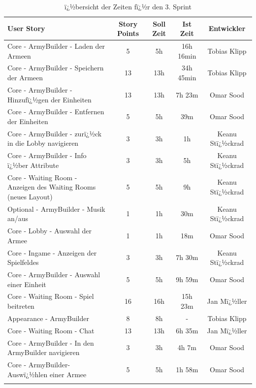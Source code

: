 \documentclass[12pt, titlepage]{scrartcl}
\begin{document}
		\begin{center}
				\begin{longtable}{p{6cm} c c c c }
					
					User Story	& Story Points & Soll Zeit & Ist Zeit & Entwickler\\
					\toprule
					\endhead
					Core - ArmyBuilder - Laden der Armeen & 5 & 5h & 16h 16min & Tobias Klipp \\ \hline 
					
					Core - ArmyBuilder - Speichern der Armeen & 13 & 13h & 34h 45min & Tobias Klipp\\ \hline
					
					Core - ArmyBuilder - Hinzufï¿½gen der Einheiten & 13 & 13h & 7h 23m & Omar Sood\\ \hline
					
					Core - ArmyBuilder - Entfernen der Einheiten & 5 & 5h & 39m & Omar Sood\\ \hline
					
					Core - ArmyBuilder - zurï¿½ck in die Lobby navigieren & 3 & 3h & 1h & Keanu Stï¿½ckrad\\ \hline
						
					Core - ArmyBuilder - Info ï¿½ber Attribute & 3 & 3h & 5h & Keanu Stï¿½ckrad\\ \hline
			
					Core - Waiting Room - Anzeigen des Waiting Rooms (neues Layout) & 5 & 5h & 9h & Keanu Stï¿½ckrad\\ \hline
					
					Optional - ArmyBuilder - Musik an/aus & 1 & 1h & 30m & Keanu Stï¿½ckrad\\ \hline
					
					Core - Lobby - Auswahl der Armee  & 1 & 1h & 18m & Omar Sood\\ \hline
					
					Core - Ingame - Anzeigen der Spielfeldes & 3 & 3h & 7h 30m &  Keanu Stï¿½ckrad\\ \hline
					
					Core - ArmyBuilder - Auswahl einer Einheit & 5 & 5h & 9h 59m & Omar Sood\\ \hline
					
					Core - Waiting Room - Spiel beitreten & 16 & 16h & 15h 23m & Jan Mï¿½ller\\ \hline
					
					Appearance - ArmyBuilder & 8 & 8h & - & Tobias Klipp \\ \hline
					
					Core - Waiting Room - Chat & 13 & 13h & 6h 35m & Jan Mï¿½ller\\ \hline
					
					Core - ArmyBuilder - In den ArmyBuilder navigieren & 3 & 3h & 4h 7m & Omar Sood\\ \hline
					
					Core - ArmyBuilder- Auswï¿½hlen einer Armee & 5 & 5h & 1h 58m & Omar Sood \\
					\caption{ï¿½bersicht der Zeiten fï¿½r den 3. Sprint} \\
				\end{longtable}
		\end{center}
			
\end{document}
